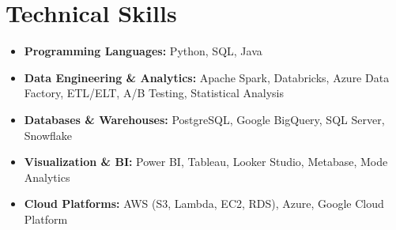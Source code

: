 \documentclass[letterpaper,11pt]{article}
\newcommand{\resumeSubHeadingListStart}{\begin{itemize}[leftmargin=0pt,label={},itemsep=-2pt]}
\newcommand{\resumeSubHeadingListEnd}{\end{itemize}}
\begin{document}
\section{Technical Skills}
 \resumeSubHeadingListStart
   \item{
      \textbf{Programming Languages:} Python, SQL, Java
    }
    \item{
      \textbf{Data Engineering \& Analytics:} Apache Spark, Databricks, Azure Data Factory, ETL/ELT, A/B Testing, Statistical Analysis
    }
    \item{
      \textbf{Databases \& Warehouses:} PostgreSQL, Google BigQuery, SQL Server, Snowflake
    }
    \item{
      \textbf{Visualization \& BI:} Power BI, Tableau, Looker Studio, Metabase, Mode Analytics
    }
    \item{
      \textbf{Cloud Platforms:} AWS (S3, Lambda, EC2, RDS), Azure, Google Cloud Platform
    }
 \resumeSubHeadingListEnd

\end{document}
